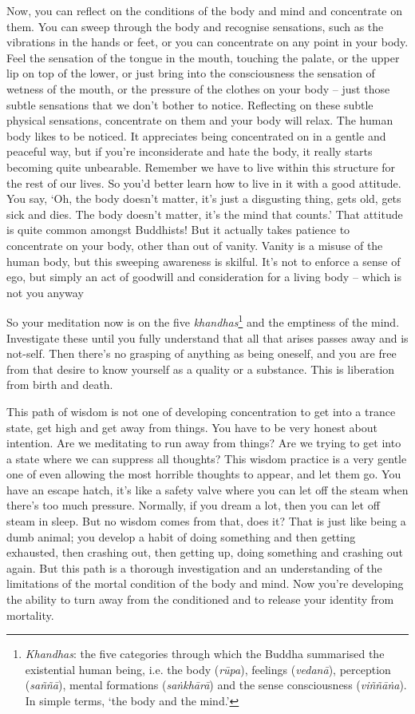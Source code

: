 Now, you can reflect on the conditions of the body and mind and concentrate on them. You can sweep through the body and recognise sensations, such as the vibrations in the hands or feet, or you can concentrate on any point in your body. Feel the sensation of the tongue in the mouth, touching the palate, or the upper lip on top of the lower, or just bring into the consciousness the sensation of wetness of the mouth, or the pressure of the clothes on your body -- just those subtle sensations that we don't bother to notice. Reflecting on these subtle physical sensations, concentrate on them and your body will relax. The human body likes to be noticed. It appreciates being concentrated on in a gentle and peaceful way, but if you're inconsiderate and hate the body, it really starts becoming quite unbearable. Remember we have to live within this structure for the rest of our lives. So you'd better learn how to live in it with a good attitude. You say, `Oh, the body doesn't matter, it's just a disgusting thing, gets old, gets sick and dies. The body doesn't matter, it's the mind that counts.' That attitude is quite common amongst Buddhists! But it actually takes patience to concentrate on your body, other than out of vanity. Vanity is a misuse of the human body, but this sweeping awareness is skilful. It's not to enforce a sense of ego, but simply an act of goodwill and consideration for a living body -- which is not you anyway 

So your meditation now is on the five \textit{khandhas}\footnote{\textit{Khandhas}: the five categories through which the Buddha summarised the existential human being, i.e. the body (\textit{r\=upa}), feelings (\textit{vedan\=a}), perception (\textit{sa\~n\~n\=a}), mental formations (\textit{sa\.nkh\=ar\=a}) and the sense consciousness (\textit{vi\~n\~n\=a\.na}). In simple terms, `the body and the mind.'} and the emptiness of the mind. Investigate these until you fully understand that all that arises passes away and is not-self. Then there's no grasping of anything as being oneself, and you are free from that desire to know yourself as a quality or a substance. This is liberation from birth and death.

This path of wisdom is not one of developing concentration to get into a trance state, get high and get away from things. You have to be very honest about intention. Are we meditating to run away from things? Are we trying to get into a state where we can suppress all thoughts? This wisdom practice is a very gentle one of even allowing the most horrible thoughts to appear, and let them go. You have an escape hatch, it's like a safety valve where you can let off the steam when there's too much pressure. Normally, if you dream a lot, then you can let off steam in sleep. But no wisdom comes from that, does it? That is just like being a dumb animal; you develop a habit of doing something and then getting exhausted, then crashing out, then getting up, doing something and crashing out again. But this path is a thorough investigation and an understanding of the limitations of the mortal condition of the body and mind. Now you're developing the ability to turn away from the conditioned and to release your identity from mortality.

